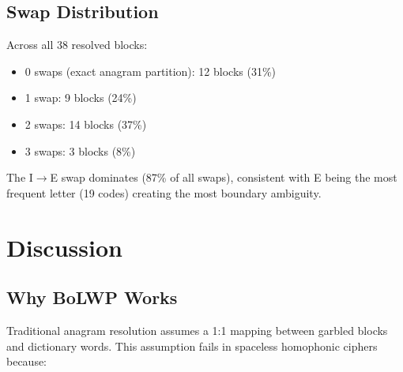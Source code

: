 \documentclass[11pt,a4paper]{article}
\begin{document}
\begin{table}[h]
\centering
{}
\end{table}

\subsection{Swap Distribution}

Across all 38 resolved blocks:
\begin{itemize}
\item 0 swaps (exact anagram partition): 12 blocks (31\%)
\item 1 swap: 9 blocks (24\%)
\item 2 swaps: 14 blocks (37\%)
\item 3 swaps: 3 blocks (8\%)
\end{itemize}

The I$\rightarrow$E swap dominates (87\% of all swaps), consistent with E being the most frequent letter (19 codes) creating the most boundary ambiguity.

\section{Discussion}

\subsection{Why BoLWP Works}

Traditional anagram resolution assumes a 1:1 mapping between garbled blocks and dictionary words. This assumption fails in spaceless homophonic ciphers because:
\end{document}

